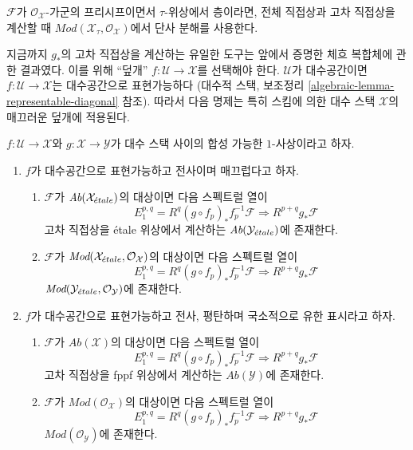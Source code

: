 \medskip\noindent
$\mathcal{F}$가 $\mathcal{O}_\mathcal{X}$-가군의 프리시프이면서
$\tau$-위상에서 층이라면, 전체 직접상과 고차 직접상을 계산할 때
$\textit{Mod}(\mathcal{X}_\tau, \mathcal{O}_\mathcal{X})$에서
단사 분해를 사용한다.

\medskip\noindent
지금까지 $g_*$의 고차 직접상을 계산하는 유일한 도구는
앞에서 증명한 체흐 복합체에 관한 결과였다. 이를 위해
``덮개'' $f : \mathcal{U} \to \mathcal{X}$를 선택해야 한다.
$\mathcal{U}$가 대수공간이면
$f : \mathcal{U} \to \mathcal{X}$는 대수공간으로 표현가능하다
(대수적 스택, 보조정리
\ref{algebraic-lemma-representable-diagonal} 참조).
따라서 다음 명제는 특히 스킴에 의한 대수 스택
$\mathcal{X}$의 매끄러운 덮개에 적용된다.

\begin{proposition}
\label{proposition-smooth-covering-compute-direct-image}
$f : \mathcal{U} \to \mathcal{X}$와 $g : \mathcal{X} \to \mathcal{Y}$가
대수 스택 사이의 합성 가능한 $1$-사상이라고 하자.
\begin{enumerate}
\item $f$가 대수공간으로 표현가능하고 전사이며 매끄럽다고 하자.
\begin{enumerate}
\item $\mathcal{F}$가 $\textit{Ab}(\mathcal{X}_{\acute{e}tale})$의 대상이면
다음 스펙트럴 열이
$$
E_1^{p, q} = R^q(g \circ f_p)_*f_p^{-1}\mathcal{F}
\Rightarrow
R^{p + q}g_*\mathcal{F}
$$
고차 직접상을 \'etale 위상에서 계산하는
$\textit{Ab}(\mathcal{Y}_{\acute{e}tale})$에 존재한다.
\item $\mathcal{F}$가
$\textit{Mod}(\mathcal{X}_{\acute{e}tale}, \mathcal{O}_\mathcal{X})$의 대상이면
다음 스펙트럴 열이
$$
E_1^{p, q} = R^q(g \circ f_p)_*f_p^{-1}\mathcal{F}
\Rightarrow
R^{p + q}g_*\mathcal{F}
$$
$\textit{Mod}(\mathcal{Y}_{\acute{e}tale}, \mathcal{O}_\mathcal{Y})$에 존재한다.
\end{enumerate}
\item $f$가 대수공간으로 표현가능하고 전사, 평탄하며 국소적으로
유한 표시라고 하자.
\begin{enumerate}
\item $\mathcal{F}$가 $\textit{Ab}(\mathcal{X})$의 대상이면
다음 스펙트럴 열이
$$
E_1^{p, q} = R^q(g \circ f_p)_*f_p^{-1}\mathcal{F}
\Rightarrow
R^{p + q}g_*\mathcal{F}
$$
고차 직접상을 fppf 위상에서 계산하는
$\textit{Ab}(\mathcal{Y})$에 존재한다.
\item $\mathcal{F}$가 $\textit{Mod}(\mathcal{O}_\mathcal{X})$의 대상이면
다음 스펙트럴 열이
$$
E_1^{p, q} = R^q(g \circ f_p)_*f_p^{-1}\mathcal{F}
\Rightarrow
R^{p + q}g_*\mathcal{F}
$$
$\textit{Mod}(\mathcal{O}_\mathcal{Y})$에 존재한다.
\end{enumerate}
\end{enumerate}
\end{proposition}


